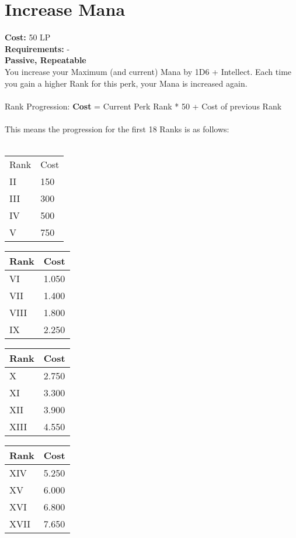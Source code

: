 \section{Increase Mana}\label{perk:increasemana}
\textbf{Cost:} 50 LP\\
\textbf{Requirements:} -\\
\textbf{Passive, Repeatable}\\
You increase your Maximum (and current)  Mana by 1D6 + Intellect.
Each time you gain a higher Rank for this perk, your Mana is increased again.\\
\\
Rank Progression: \textbf{Cost} = Current Perk Rank * 50 + Cost of previous Rank\\
\\
This means the progression for the first 18 Ranks is as follows:\\
\\
\begin{minipage}{0.25\textwidth}
    \begin{tabular}{l | l}
        Rank & Cost\\
        II & 150\\
        III & 300\\
        IV & 500\\
        V & 750\\
    \end{tabular}
\end{minipage}
\begin{minipage}{0.25\textwidth}
    \begin{tabular}{l | l}
        Rank & Cost\\ \hline
        VI & 1.050\\
        VII & 1.400\\
        VIII & 1.800\\
        IX & 2.250\\
    \end{tabular}
\end{minipage}
\begin{minipage}{0.25\textwidth}
    \begin{tabular}{l | l}
        Rank & Cost\\ \hline
        X & 2.750\\
        XI & 3.300\\
        XII & 3.900\\
        XIII & 4.550\\
    \end{tabular}
\end{minipage}
\begin{minipage}{0.25\textwidth}
    \begin{tabular}{l | l}
        Rank & Cost\\ \hline
        XIV & 5.250\\
        XV & 6.000\\
        XVI & 6.800\\
        XVII & 7.650\\
    \end{tabular}
\end{minipage}
